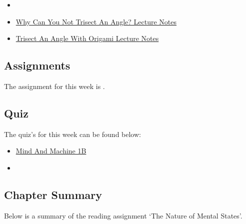 \begin{itemize}
    \item {}
    \item \href{https://www.youtube.com/watch?v=6Lm9EHhbJAY}{Why Can You Not Trisect An Angle? Lecture Notes}
    \item \href{https://www.youtube.com/watch?v=SL2lYcggGpc}{Trisect An Angle With Origami Lecture Notes}
\end{itemize}

\subsection{Assignments}

The assignment for this week is .  

\subsection{Quiz}

The quiz's for this week can be found below:

\begin{itemize}
    \item \href{https://applied.cs.colorado.edu/mod/quiz/view.php?id=49332}{Mind And Machine 1B}  
    \item {}
\end{itemize}

\subsection{Chapter Summary}

Below is a summary of the reading assignment `The Nature of Mental States'.


